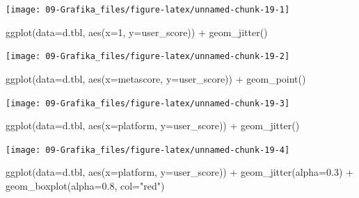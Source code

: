 \documentclass[
]{book}
\newenvironment{Shaded}{\begin{snugshade}}{\end{snugshade}}
\newcommand{\AttributeTok}[1]{\textcolor[rgb]{0.77,0.63,0.00}{#1}}
\newcommand{\DecValTok}[1]{\textcolor[rgb]{0.00,0.00,0.81}{#1}}
\newcommand{\FloatTok}[1]{\textcolor[rgb]{0.00,0.00,0.81}{#1}}
\newcommand{\FunctionTok}[1]{\textcolor[rgb]{0.00,0.00,0.00}{#1}}
\newcommand{\NormalTok}[1]{#1}
\newcommand{\SpecialCharTok}[1]{\textcolor[rgb]{0.00,0.00,0.00}{#1}}
\newcommand{\StringTok}[1]{\textcolor[rgb]{0.31,0.60,0.02}{#1}}
\begin{document}
\begin{center}\texttt{[image: 09-Grafika\_files/figure-latex/unnamed-chunk-19-1]} \end{center}

\begin{Shaded}
\begin{Highlighting}[]
\FunctionTok{ggplot}\NormalTok{(}\AttributeTok{data=}\NormalTok{d.tbl, }\FunctionTok{aes}\NormalTok{(}\AttributeTok{x=}\DecValTok{1}\NormalTok{, }\AttributeTok{y=}\NormalTok{user\_score)) }\SpecialCharTok{+} \FunctionTok{geom\_jitter}\NormalTok{() }
\end{Highlighting}
\end{Shaded}

\begin{center}\texttt{[image: 09-Grafika\_files/figure-latex/unnamed-chunk-19-2]} \end{center}

\begin{Shaded}
\begin{Highlighting}[]


\FunctionTok{ggplot}\NormalTok{(}\AttributeTok{data=}\NormalTok{d.tbl, }\FunctionTok{aes}\NormalTok{(}\AttributeTok{x=}\NormalTok{metascore, }\AttributeTok{y=}\NormalTok{user\_score)) }\SpecialCharTok{+} \FunctionTok{geom\_point}\NormalTok{()}
\end{Highlighting}
\end{Shaded}

\begin{center}\texttt{[image: 09-Grafika\_files/figure-latex/unnamed-chunk-19-3]} \end{center}

\begin{Shaded}
\begin{Highlighting}[]
\FunctionTok{ggplot}\NormalTok{(}\AttributeTok{data=}\NormalTok{d.tbl, }\FunctionTok{aes}\NormalTok{(}\AttributeTok{x=}\NormalTok{platform, }\AttributeTok{y=}\NormalTok{user\_score)) }\SpecialCharTok{+} \FunctionTok{geom\_jitter}\NormalTok{() }
\end{Highlighting}
\end{Shaded}

\begin{center}\texttt{[image: 09-Grafika\_files/figure-latex/unnamed-chunk-19-4]} \end{center}

\begin{Shaded}
\begin{Highlighting}[]
\FunctionTok{ggplot}\NormalTok{(}\AttributeTok{data=}\NormalTok{d.tbl, }\FunctionTok{aes}\NormalTok{(}\AttributeTok{x=}\NormalTok{platform, }\AttributeTok{y=}\NormalTok{user\_score)) }\SpecialCharTok{+} \FunctionTok{geom\_jitter}\NormalTok{(}\AttributeTok{alpha=}\FloatTok{0.3}\NormalTok{) }\SpecialCharTok{+} \FunctionTok{geom\_boxplot}\NormalTok{(}\AttributeTok{alpha=}\FloatTok{0.8}\NormalTok{, }\AttributeTok{col=}\StringTok{"red"}\NormalTok{) }
\end{Highlighting}
\end{Shaded}
\end{document}
